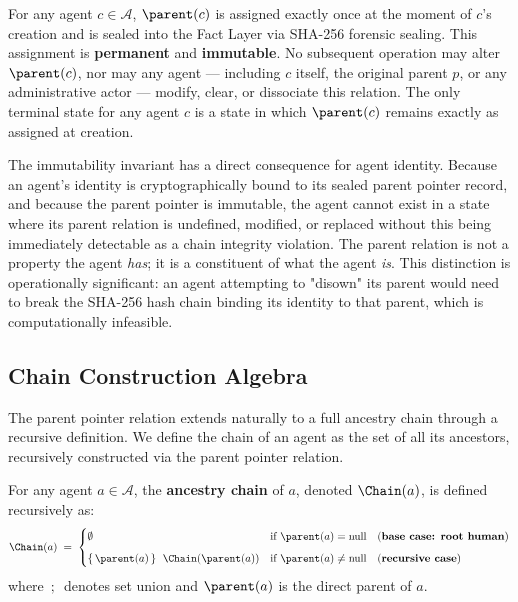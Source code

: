 \begin{invariant}
\label{inv:pp_immutability}
For any agent $c \in \mathcal{A}$, $\parent(c)$ is assigned exactly once at the moment of $c$'s creation and is sealed into the Fact Layer via SHA-256 forensic sealing. This assignment is \textbf{permanent} and \textbf{immutable}. No subsequent operation may alter $\parent(c)$, nor may any agent — including $c$ itself, the original parent $p$, or any administrative actor — modify, clear, or dissociate this relation. The only terminal state for any agent $c$ is a state in which $\parent(c)$ remains exactly as assigned at creation.
\end{invariant}

The immutability invariant has a direct consequence for agent identity. Because an agent's identity is cryptographically bound to its sealed parent pointer record, and because the parent pointer is immutable, the agent cannot exist in a state where its parent relation is undefined, modified, or replaced without this being immediately detectable as a chain integrity violation. The parent relation is not a property the agent \emph{has}; it is a constituent of what the agent \emph{is}. This distinction is operationally significant: an agent attempting to "disown" its parent would need to break the SHA-256 hash chain binding its identity to that parent, which is computationally infeasible.

\subsection{Chain Construction Algebra}

The parent pointer relation extends naturally to a full ancestry chain through a recursive definition. We define the chain of an agent as the set of all its ancestors, recursively constructed via the parent pointer relation.

\begin{definition}
\label{def:chain}
For any agent $a \in \mathcal{A}$, the \textbf{ancestry chain} of $a$, denoted $\Chain(a)$, is defined recursively as:
\begin{equation}
\Chain(a) \;=\;
\begin{cases}
\emptyset & \text{if } \parent(a) = \text{null} \quad \text{(\textbf{base case: root human})} \\[6pt]
\{\,\parent(a)\,\} \;\ \Chain(\parent(a)) & \text{if } \parent(a) \neq \text{null} \quad \text{(\textbf{recursive case})}
\end{cases}
\end{equation}
where $\,;\,$ denotes set union and $\parent(a)$ is the direct parent of $a$.
\end{definition}

